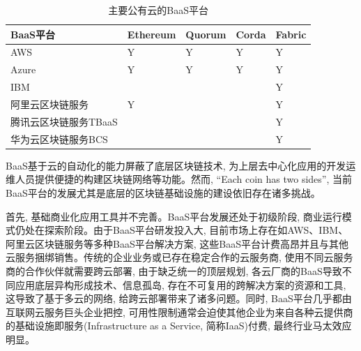 {\footnotesize
\begin{longtable}[h]{m{100pt} m{50pt} m{50pt} m{50pt} m{50pt}}
    \caption[主要公有云的BaaS平台]{主要公有云的BaaS平台} \label{major_BaaS_platforms} \\
        \toprule  
        \textbf{BaaS平台}&\textbf{Ethereum}&\textbf{Quorum}&\textbf{Corda}&\textbf{Fabric}\\
        \hline
        
        AWS&Y&Y&Y&Y\\

        Azure&Y&Y&Y&Y\\

        IBM& & & &Y\\

        阿里云区块链服务&Y& & &Y\\

        腾讯云区块链服务TBaaS& & & &Y\\

        华为云区块链服务BCS& & & &Y\\
        \bottomrule
    \end{longtable}
}



BaaS基于云的自动化的能力屏蔽了底层区块链技术, 为上层去中心化应用的开发运维人员提供便捷的构建区块链网络等功能。然而, “Each coin has two sides”, 当前BaaS平台的发展尤其是底层的区块链基础设施的建设依旧存在诸多挑战。

首先, 基础商业化应用工具并不完善\footnotemark[2]。BaaS平台发展还处于初级阶段, 商业运行模式仍处在探索阶段。由于BaaS平台研发投入大, 目前市场上存在如AWS、IBM、阿里云区块链服务等多种BaaS平台解决方案, 这些BaaS平台计费高昂\footnotemark[3]并且与其他云服务捆绑销售。传统的企业业务或已存在稳定合作的云服务商, 使用不同云服务商的合作伙伴就需要跨云部署, 由于缺乏统一的顶层规划, 各云厂商的BaaS导致不同应用底层异构形成技术、信息孤岛, 存在不可复用的跨解决方案的资源和工具, 这导致了基于多云的网络\cite{DBLP:conf/coins/GerritsKKFV21}, 给跨云部署带来了诸多问题。同时, BaaS平台几乎都由互联网云服务巨头企业把控, 可用性限制通常会迫使其他企业为来自各种云提供商的基础设施即服务(Infrastructure as a Service, 简称IaaS)付费, 最终行业马太效应明显\cite{KuernetesbasedFabricChaincodeManagementAndHihgAvailabilityTechnology}。

